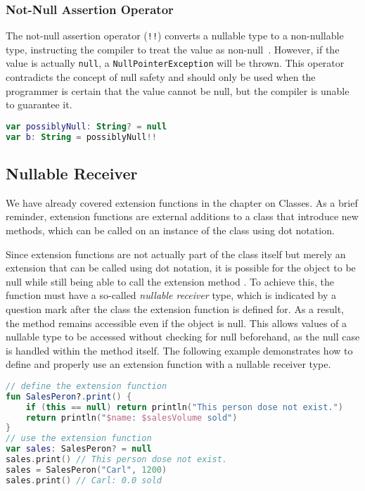 \documentclass[a4paper,11pt]{article}
\begin{document}
\subsubsection{Not-Null Assertion Operator}
The not-null assertion operator (\texttt{!!}) converts a nullable type to a non-nullable type, instructing the compiler to treat the value as non-null~\cite{nullsafety-assertion}. However, if the value is actually \texttt{null}, a \texttt{NullPointerException} will be thrown.
This operator contradicts the concept of null safety and should only be used when the programmer is certain that the value cannot be null, but the compiler is unable to guarantee it.

\begin{lstlisting}[language=Kotlin, title={Usage of the not-null assertion}]
var possiblyNull: String? = null
var b: String = possiblyNull!!
\end{lstlisting}

\subsection{Nullable Receiver}
We have already covered extension functions in the chapter on Classes. As a brief reminder, extension functions are external additions to a class that introduce new methods, which can be called on an instance of the class using dot notation.

Since extension functions are not actually part of the class itself but merely an extension that can be called using dot notation, it is possible for the object to be null while still being able to call the extension method \cite{nullsafety-nullable-receiver}. To achieve this, the function must have a so-called \textit{nullable receiver} type, which is indicated by a question mark after the class the extension function is defined for. As a result, the method remains accessible even if the object is null. This allows values of a nullable type to be accessed without checking for null beforehand, as the null case is handled within the method itself. The following example demonstrates how to define and properly use an extension function with a nullable receiver type.
\begin{lstlisting}[language=Kotlin,title={Usage of an extension function}]
// define the extension function
fun SalesPeron?.print() {
    if (this == null) return println("This person dose not exist.")
    return println("$name: $salesVolume sold")
}
// use the extension function
var sales: SalesPeron? = null
sales.print() // This person dose not exist.
sales = SalesPeron("Carl", 1200)
sales.print() // Carl: 0.0 sold
\end{lstlisting}
\end{document}
